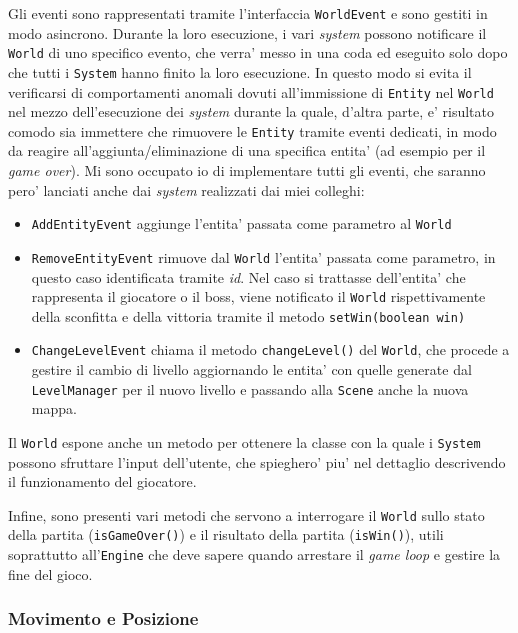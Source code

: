 \documentclass[a4paper,12pt]{report}
\begin{document}
Gli eventi sono rappresentati tramite l'interfaccia \texttt{WorldEvent} e sono gestiti in modo asincrono. Durante la loro esecuzione, i vari \textit{system} possono notificare il \texttt{World} di uno specifico evento, che verra' messo in una coda ed eseguito solo dopo che tutti i \texttt{System} hanno finito la loro esecuzione. In questo modo si evita il verificarsi di comportamenti anomali dovuti all'immissione di \texttt{Entity} nel \texttt{World} nel mezzo dell'esecuzione dei \textit{system} durante la quale, d'altra parte, e' risultato comodo sia immettere che rimuovere le \texttt{Entity} tramite eventi dedicati, in modo da reagire all'aggiunta/eliminazione di una specifica entita' (ad esempio per il \textit{game over}). Mi sono occupato io di implementare tutti gli eventi, che saranno pero' lanciati anche dai \textit{system} realizzati dai miei colleghi:
\begin{itemize}
	\item \texttt{AddEntityEvent} aggiunge l'entita' passata come parametro al \texttt{World}
	\item \texttt{RemoveEntityEvent} rimuove dal \texttt{World} l'entita' passata come parametro, in questo caso identificata tramite \textit{id}. Nel caso si trattasse dell'entita' che rappresenta il giocatore o il boss, viene notificato il \texttt{World} rispettivamente della sconfitta e della vittoria tramite il metodo \texttt{setWin(boolean win)}
	\item \texttt{ChangeLevelEvent} chiama il metodo \texttt{changeLevel()} del \texttt{World}, che procede a gestire il cambio di livello aggiornando le entita' con quelle generate dal \texttt{LevelManager} per il nuovo livello e passando alla \texttt{Scene} anche la nuova mappa.
\end{itemize}

Il \texttt{World} espone anche un metodo per ottenere la classe con la quale i \texttt{System} possono sfruttare l'input dell'utente, che spieghero' piu' nel dettaglio descrivendo il funzionamento del giocatore.

Infine, sono presenti vari metodi che servono a interrogare il \texttt{World} sullo stato della partita
(\texttt{isGameOver()}) e il risultato della partita (\texttt{isWin()}), utili soprattutto all'\texttt{Engine} che deve sapere quando arrestare il \textit{game loop} e gestire la fine del gioco.

\subsubsection{Movimento e Posizione}
\end{document}
